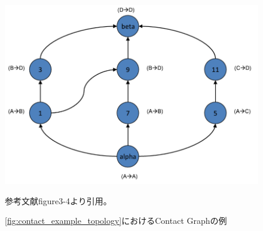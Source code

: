 \begin{figure}[tbh]
    \centering
    \includegraphics[width=0.5\textheight]{img/contact_example_contactgraph.pdf}
    \caption{\ref{fig:contact_example_topology}におけるContact Graphの例}
    \label{fig:contact_example_contactgraph}
    \begin{minipage}{\textwidth}
        \centering
        \vspace{3mm}
        参考文献\cite{schedule_aware_bundle_routing}figure3-4より引用。
    \end{minipage}
\end{figure}